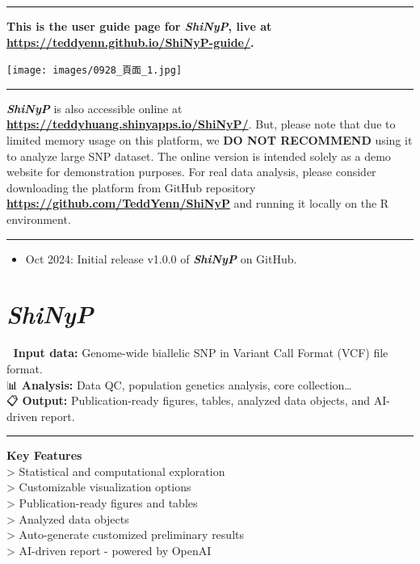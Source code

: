 \documentclass[
]{book}
\providecommand{\tightlist}{%
  \setlength{\itemsep}{0pt}\setlength{\parskip}{0pt}}
\begin{document}
\begin{center}\rule{0.5\linewidth}{0.5pt}\end{center}

\textbf{This is the user guide page for {\emph{ShiNyP}}, live at \url{https://teddyenn.github.io/ShiNyP-guide/}.}

\texttt{[image: images/0928\_頁面\_1.jpg]}

\begin{center}\rule{0.5\linewidth}{0.5pt}\end{center}

{\textbf{\emph{ShiNyP}}} is also accessible online at \textbf{\url{https://teddyhuang.shinyapps.io/ShiNyP/}}. But, please note that due to limited memory usage on this platform, we {\textbf{DO NOT RECOMMEND}} using it to analyze large SNP dataset. The online version is intended solely as a demo website for demonstration purposes. For real data analysis, please consider downloading the platform from GitHub repository \textbf{\url{https://github.com/TeddYenn/ShiNyP}} and running it locally on the R environment.

\begin{center}\rule{0.5\linewidth}{0.5pt}\end{center}

\begin{itemize}
\tightlist
\item
  Oct 2024: Initial release v1.0.0 of {\textbf{\emph{ShiNyP}}} on GitHub.
\end{itemize}

\chapter{\texorpdfstring{\emph{ShiNyP}}{ShiNyP}}\label{sec-shinyp}

📄 \textbf{Input data:} Genome-wide biallelic SNP in Variant Call Format (VCF) file format.\\
📊 \textbf{Analysis:} Data QC, population genetics analysis, core collection\ldots{}\\
📋 \textbf{Output:} Publication-ready figures, tables, analyzed data objects, and AI-driven report.

\begin{center}\rule{0.5\linewidth}{0.5pt}\end{center}

\textbf{Key Features}\\
\textgreater{} Statistical and computational exploration\\
\textgreater{} Customizable visualization options\\
\textgreater{} Publication-ready figures and tables\\
\textgreater{} Analyzed data objects\\
\textgreater{} Auto-generate customized preliminary results\\
\textgreater{} AI-driven report - powered by OpenAI
\end{document}

